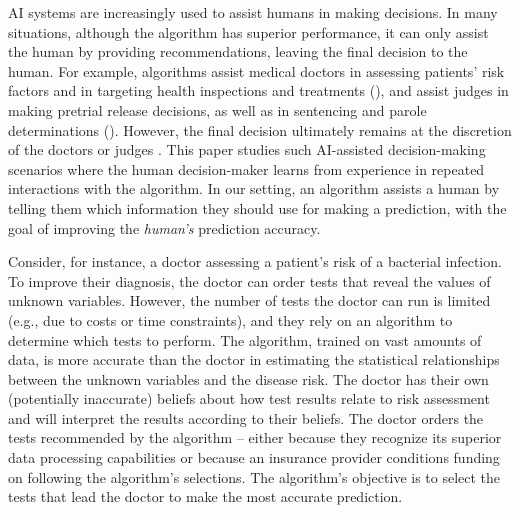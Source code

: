 

AI systems are increasingly used to assist humans in making decisions. In many situations, although
the algorithm has superior performance, it can only assist the human by providing recommendations, leaving the final decision to the human.
For example, 
algorithms assist medical doctors in assessing patients' risk factors and in targeting health inspections and treatments (\cite{musen2021,garcia2019,tomavsev2019,jayatilake2021}), and assist judges in making pretrial release decisions, as well as in sentencing and parole determinations (\cite{courts2020, nyc_cja_2020,compas2019}). However, the final decision ultimately remains at the discretion of the doctors or judges \cite{casey2019rethinking,european2021proposal}. 
This paper studies such AI-assisted decision-making scenarios where the human decision-maker learns from experience in repeated interactions with the algorithm. In our setting, an algorithm assists a human by 
telling them which information they should use for making a prediction, with the goal of improving the {\em human's} prediction accuracy.

Consider, for instance, a doctor assessing a patient's risk of a bacterial infection. To improve their diagnosis, the doctor can order tests that reveal the values of unknown variables. However, the number of tests the doctor can run is limited (e.g., due to costs or time constraints), and they rely on an algorithm to determine which tests to perform. The algorithm, trained on vast amounts of data, is more accurate than the doctor in estimating the statistical relationships between the unknown variables and the disease risk. The doctor has their own (potentially inaccurate) beliefs about how test results relate to risk assessment and will interpret the results according to their beliefs. The doctor orders the tests recommended by the algorithm
-- either because they recognize its superior data processing capabilities or because an insurance provider conditions funding on following the algorithm's selections. The algorithm's objective is to select the tests that lead the doctor to make the most accurate prediction.




